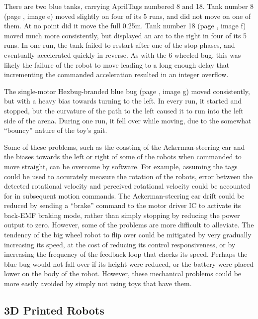 There are two blue tanks, carrying AprilTags numbered 8 and 18. 
Tank number 8 (page \pageref{img_traj}, image e) moved slightly on four of its 5 runs, and did not move on one of them. 
At no point did it move the full 0.25m. 
Tank number 18 (page \pageref{img_traj}, image f) moved much more consistently, but displayed an arc to the right in four of its 5 runs. 
In one run, the tank failed to restart after one of the stop phases, and eventually accelerated quickly in reverse. 
As with the 6-wheeled bug, this was likely the failure of the robot to move leading to a long enough delay that incrementing the commanded acceleration resulted in an integer overflow. 

The single-motor Hexbug-branded blue bug (page \pageref{img_traj}, image g) moved consistently, but with a heavy bias towards turning to the left. 
In every run, it started and stopped, but the curvature of the path to the left caused it to run into the left side of the arena. 
During one run, it fell over while moving, due to the somewhat ``bouncy'' nature of the toy's gait.

Some of these problems, such as the coasting of the Ackerman-steering car and the biases towards the left or right of some of the robots when commanded to move straight, can be overcome by software. 
For example, assuming the tags could be used to accurately measure the rotation of the robots, error between the detected rotational velocity and perceived rotational velocity could be accounted for in subsequent motion commands. 
The Ackerman-steering car drift could be reduced by sending a ``brake'' command to the motor driver IC to activate its back-EMF braking mode, rather than simply stopping by reducing the power output to zero. 
However, some of the problems are more difficult to alleviate. 
The tendency of the big wheel robot to flip over could be mitigated by very gradually increasing its speed, at the cost of reducing its control responsiveness, or by increasing the frequency of the feedback loop that checks its speed. 
Perhaps the blue bug would not fall over if its height were reduced, or the battery were placed lower on the body of the robot.
However, these mechanical problems could be more easily avoided by simply not using toys that have them. 

\subsection{3D Printed Robots}

